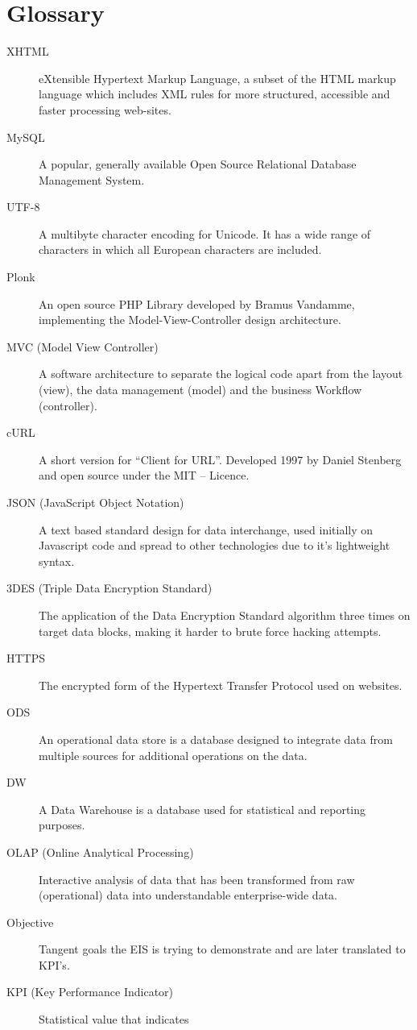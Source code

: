 \chapter*{Glossary}
\begin{description}
\item[XHTML] eXtensible Hypertext Markup Language, a subset of the HTML markup
language which includes XML rules for more structured, accessible and faster
processing web-sites.
\item[MySQL] A popular, generally available Open Source Relational Database
Management System.
\item[UTF-8] A multibyte character encoding for Unicode. It has a wide range of
characters in which all European characters are included.
\item[Plonk] An open source PHP Library developed by Bramus Vandamme,
implementing the Model-View-Controller design architecture.
\item[MVC (Model View Controller)] A software architecture to separate the
logical code apart from the layout (view), the data management (model) and the
business Workflow (controller).
\item[cURL] A short version for “Client for URL”. Developed 1997 by Daniel
Stenberg and open source under the MIT – Licence.
\item[JSON (JavaScript Object Notation)] A text based standard design for data
interchange, used initially on Javascript code and spread to other technologies
due to it's lightweight syntax.
\item[3DES (Triple Data Encryption Standard)] The application of the Data
Encryption Standard algorithm three times on target data blocks, making it
harder to brute force hacking attempts. 
\item[HTTPS] The encrypted form of the Hypertext Transfer Protocol used on
websites.
\item[ODS] An operational data store is a database designed to integrate
data from multiple sources for additional operations on the data.
\item[DW] A Data Warehouse is a database used for statistical and reporting
purposes.
\item[OLAP (Online Analytical Processing)] Interactive analysis of data that
has been transformed from raw (operational) data into understandable 
enterprise-wide data.
\item[Objective] Tangent goals the EIS is trying to demonstrate and are later
translated to KPI's.
\item[KPI (Key Performance Indicator)] Statistical value that indicates

\end{description}
